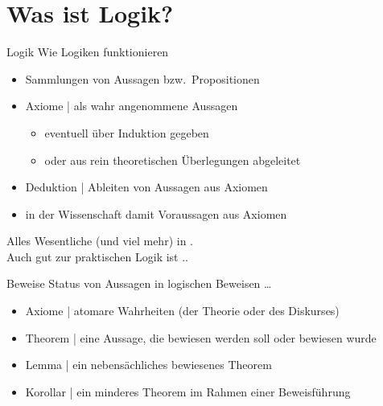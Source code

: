 \section{Was ist Logik?}

\begin{frame}
  {Logik}
  \onslide<+->
  \onslide<+->
  Wie Logiken funktionieren\\
  \Halbzeile
  \begin{itemize}[<+->]
    \item Sammlungen von Aussagen bzw.\ \alert{Propositionen}
    \item Axiome | als \alert{wahr angenommene} Aussagen
      \begin{itemize}[<+->]
        \item eventuell über Induktion gegeben
        \item oder aus rein theoretischen Überlegungen abgeleitet
      \end{itemize}
    \item \alert{Deduktion} | Ableiten von Aussagen aus Axiomen
    \item in der Wissenschaft damit \alert{Voraussagen} aus Axiomen
  \end{itemize}
  \onslide<+->
  \Halbzeile
  \centering 
  Alles Wesentliche (und viel mehr) in \citet[87-246]{ParteeEa1990}.\\
  Auch gut zur praktischen Logik ist \citet{Bucher1998}..
\end{frame}

\begin{frame}
  {Beweise}
  \onslide<+->
  \onslide<+->
  Status von Aussagen in logischen Beweisen \ldots\\
  \Halbzeile
  \begin{itemize}[<+->]
    \item \alert{Axiome} | atomare Wahrheiten (der Theorie oder des Diskurses)
    \item \alert{Theorem} | eine Aussage, die bewiesen werden soll oder bewiesen wurde
    \item \alert{Lemma} | ein nebensächliches bewiesenes Theorem
    \item \alert{Korollar} | ein minderes Theorem im Rahmen einer Beweisführung
  \end{itemize}
\end{frame}

